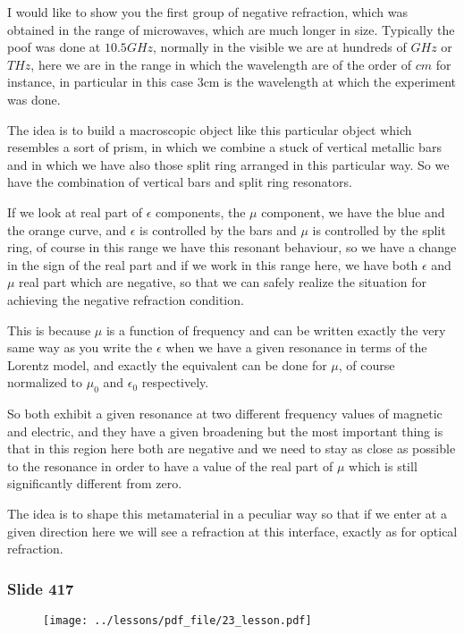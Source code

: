 \documentclass[../main/main.tex]{subfiles}
\begin{document}
I would like to show you the first group of negative refraction, which was obtained in the range of microwaves, which are much longer in size. Typically the poof was done at $10.5 GHz$, normally in the visible we are at hundreds of $GHz$ or $THz$, here we are in the range in which the wavelength are of the order of $cm$ for instance, in particular in this case 3cm is the wavelength at which the experiment was done.

The idea is to build a macroscopic object like this particular object which resembles a sort of prism, in which we combine a stuck of vertical metallic bars and in which we have also those split ring arranged in this particular way. So we have the combination of vertical bars and split ring resonators. 

If we look at real part of $\epsilon$ components, the $\mu$ component, we have the blue and the orange curve, and $\epsilon$ is controlled by the bars and $\mu$ is controlled by the split ring, of course in this range we have this resonant behaviour, so we have a change in the sign of the real part and if we work in this range here, we have both $\epsilon$ and $\mu$ real part which are negative, so that we can safely realize the situation for achieving the negative refraction condition.

This is because $\mu$ is a function of frequency and can be written exactly the very same way as you write the $\epsilon$ when we have a given resonance in terms of the Lorentz model, and exactly the equivalent can be done for $\mu$, of course normalized to $\mu_0$ and $\epsilon_0$ respectively.

So both exhibit a given resonance at two different frequency values of magnetic and electric, and they have a given broadening but the most important thing is that in this region here both are negative and we need to stay as close as possible to the resonance in order to have a value of the real part of $\mu$ which is still significantly different from zero.

The idea is to shape this metamaterial in a peculiar way so that if we enter at a given direction here we will see a refraction at this interface, exactly as for optical refraction. 

\newpage

\subsubsection{Slide 417}

\begin{figure}[h!]
\centering
\texttt{[image: ../lessons/pdf\_file/23\_lesson.pdf]}
\end{figure}
\end{document}
